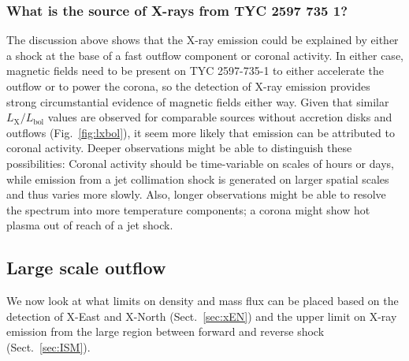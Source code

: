 \documentclass[linenumbers]{aastex631}
\begin{document}
\subsubsection{What is the source of X-rays from TYC 2597 735 1?}
The discussion above shows that the X-ray emission could be explained by either a shock at the base of a fast outflow component or coronal activity. In either case, magnetic fields need to be present on TYC 2597-735-1 to either accelerate the outflow or to power the corona, so the detection of X-ray emission provides strong circumstantial evidence of magnetic fields either way. Given that similar $L_\mathrm{X}/L_\mathrm{bol}$ values are observed for comparable sources without accretion disks and outflows (Fig.~\ref{fig:lxbol}), it seem more likely that emission can be attributed to coronal activity. Deeper observations might be able to distinguish these possibilities: Coronal activity should be time-variable on scales of hours or days, while emission from a jet collimation shock is generated on larger spatial scales and thus varies more slowly. Also, longer observations might be able to resolve the spectrum into more temperature components; a corona might show hot plasma out of reach of a jet shock.

\subsection{Large scale outflow}
\label{sec:outflow}
We now look at what limits on density and mass flux can be placed based on the detection of X-East and X-North (Sect.~\ref{sec:xEN}) and the upper limit on X-ray emission from the large region between forward and reverse shock (Sect.~\ref{sec:ISM}).

\end{document}
